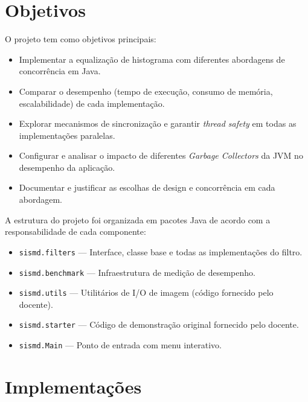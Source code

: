 \documentclass[a4paper,11pt,openright,BCOR=15mm]{scrbook}
\begin{document}
\chapter{Objetivos}

O projeto tem como objetivos principais:

\begin{itemize}
    \item Implementar a equalização de histograma com diferentes abordagens de concorrência em Java.
    \item Comparar o desempenho (tempo de execução, consumo de memória, escalabilidade) de cada implementação.
    \item Explorar mecanismos de sincronização e garantir \textit{thread safety} em todas as implementações paralelas.
    \item Configurar e analisar o impacto de diferentes \textit{Garbage Collectors} da JVM no desempenho da aplicação.
    \item Documentar e justificar as escolhas de design e concorrência em cada abordagem.
\end{itemize}

A estrutura do projeto foi organizada em pacotes Java de acordo com a responsabilidade de cada componente:

\begin{itemize}
    \item \texttt{sismd.filters} --- Interface, classe base e todas as implementações do filtro.
    \item \texttt{sismd.benchmark} --- Infraestrutura de medição de desempenho.
    \item \texttt{sismd.utils} --- Utilitários de I/O de imagem (código fornecido pelo docente).
    \item \texttt{sismd.starter} --- Código de demonstração original fornecido pelo docente.
    \item \texttt{sismd.Main} --- Ponto de entrada com menu interativo.
\end{itemize}

\chapter{Implementações}
\end{document}
